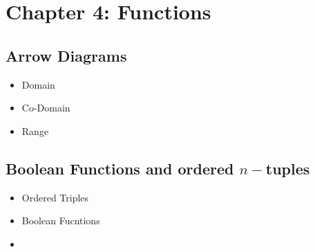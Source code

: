 \newpage

\section*{Chapter 4: Functions}

\subsection{Arrow Diagrams}

\begin{itemize}
\item Domain 
\item Co-Domain 
\item Range
\end{itemize}

\newpage
\subsection{Boolean Functions and ordered $n-$tuples}


\begin{itemize}
\item Ordered Triples
\item Boolean Fucntions
\item
\end{itemize}